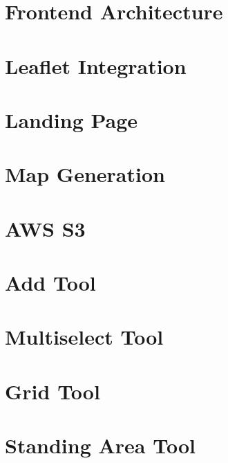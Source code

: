 \section{Frontend Architecture}


\section{Leaflet Integration}


\section{Landing Page}


\section{Map Generation}


\section{AWS S3}


\section{Add Tool}


\section{Multiselect Tool}


\section{Grid Tool}
\label{sec:grid-tool}


\section{Standing Area Tool}

